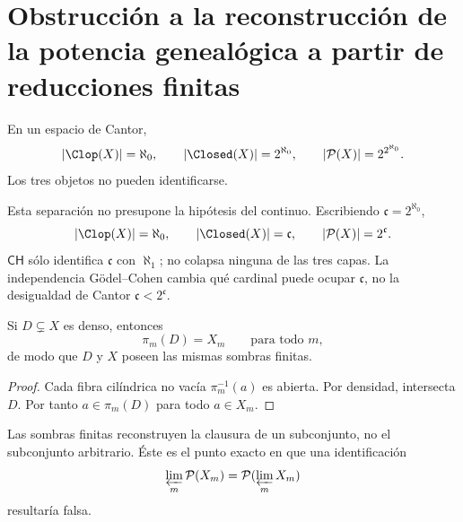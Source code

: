 \section{Obstrucción a la reconstrucción de la potencia genealógica a partir de reducciones finitas}

En un espacio de Cantor,
\[
 |\Clop(X)|=\aleph_0,
 \qquad
 |\Closed(X)|=2^{\aleph_0},
 \qquad
 |\mathcal P(X)|=2^{2^{\aleph_0}}.
\]
Los tres objetos no pueden identificarse.

Esta separación no presupone la hipótesis del continuo. Escribiendo
\(\mathfrak c=2^{\aleph_0}\),
\[
 |\Clop(X)|=\aleph_0,\qquad
 |\Closed(X)|=\mathfrak c,\qquad
 |\mathcal P(X)|=2^{\mathfrak c}.
\]
\(\mathsf{CH}\) sólo identifica \(\mathfrak c\) con \(\aleph_1\); no
colapsa ninguna de las tres capas. La independencia Gödel--Cohen cambia qué
cardinal puede ocupar \(\mathfrak c\), no la desigualdad de Cantor
\(\mathfrak c<2^{\mathfrak c}\).

\begin{proposition}
Si \(D\subsetneq X\) es denso, entonces
\[
  \pi_m(D)=X_m
  \qquad\text{para todo }m,
\]
de modo que \(D\) y \(X\) poseen las mismas sombras finitas.
\end{proposition}

\begin{proof}
Cada fibra cilíndrica no vacía \(\pi_m^{-1}(a)\) es abierta. Por densidad,
intersecta \(D\). Por tanto \(a\in\pi_m(D)\) para todo \(a\in X_m\).
\end{proof}

Las sombras finitas reconstruyen la clausura de un subconjunto, no el
subconjunto arbitrario. Éste es el punto exacto en que una identificación
\[
  \varprojlim_m\mathcal P(X_m)
  =
  \mathcal P(\varprojlim_mX_m)
\]
resultaría falsa.


